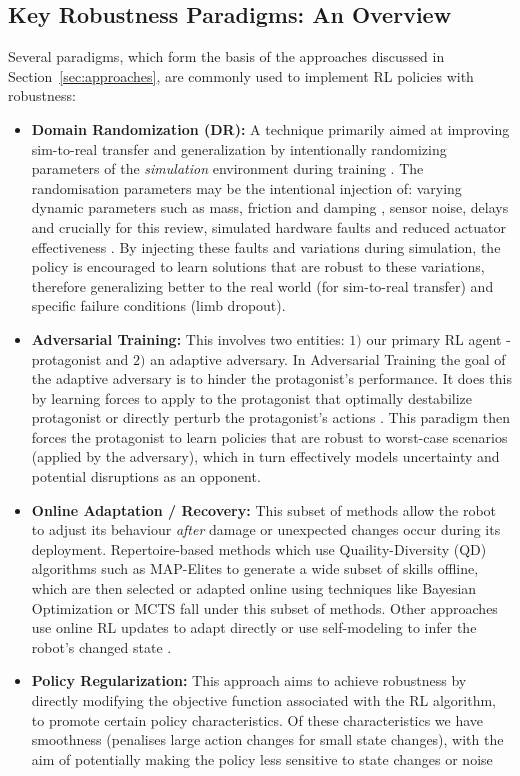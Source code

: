 \documentclass[12pt, a4paper]{article} %
\begin{document}
\subsection{Key Robustness Paradigms: An Overview}
Several paradigms, which form the basis of the approaches discussed in Section~\ref{sec:approaches}, are commonly used to implement RL policies with robustness:
\begin{itemize}
    \item \textbf{Domain Randomization (DR):} A technique primarily aimed at improving sim-to-real transfer and generalization by intentionally randomizing parameters of the \textit{simulation} environment during training \citep{tobin2017domain}. The randomisation parameters may be the intentional injection of: varying dynamic parameters such as mass, friction and damping \citep{peng2018sim, rajeswaran2016epopt}, sensor noise, delays and crucially for this review, simulated hardware faults and reduced actuator effectiveness \citep{liu2023saving}. By injecting these faults and variations during simulation, the policy is encouraged to learn solutions that are robust to these variations, therefore generalizing better to the real world (for sim-to-real transfer) and specific failure conditions (limb dropout).
    \item \textbf{Adversarial Training:} This involves two entities: $1)$ our primary RL agent -protagonist and $2)$ an adaptive adversary. In Adversarial Training the goal of the adaptive adversary is to hinder the protagonist's performance. It does this by learning forces to apply to the protagonist that optimally destabilize protagonist \citep{pinto2017robust} or directly perturb the protagonist's actions \citep{tessler2019action}. This paradigm then forces the protagonist to learn policies that are robust to worst-case scenarios (applied by the adversary), which in turn effectively models uncertainty and potential disruptions as an opponent.
    \item \textbf{Online Adaptation / Recovery:} This subset of methods allow the robot to adjust its behaviour \textit{after} damage or unexpected changes occur during its deployment. Repertoire-based methods which use Quaility-Diversity (QD) algorithms such as MAP-Elites \citep{mouret2015illuminating} to generate a wide subset of skills offline, which are then selected or adapted online using techniques like Bayesian Optimization or MCTS \citep{cully2015robots, chatzilygeroudis2018reset, allard2023online} fall under this subset of methods. Other approaches use online RL updates to adapt directly \citep{pham2024adaptive} or use self-modeling to infer the robot's changed state \citep{bongard2006resilient}.
    \item \textbf{Policy Regularization:} This approach aims to achieve robustness by directly modifying the objective function associated with the RL algorithm, to promote certain policy characteristics. Of these characteristics we have smoothness (penalises large action changes for small state changes), with the aim of potentially making the policy less sensitive to state changes or noise \citep{shen2020deep}
\end{itemize}
\end{document}
